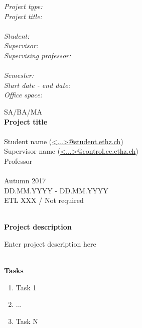 \documentclass[a4wide]{article}
\begin{document}
\noindent
\begin{minipage}[t]{0.3\textwidth}
    \textit{Project type:  \\
    Project title:  \\
    \\
    Student: \\
    Supervisor: \\
    Supervising professor: \\
    \\
    Semester: \\
    Start date - end date: \\
    Office space:}
\end{minipage}
\begin{minipage}[t]{0.6\textwidth}
	SA/BA/MA \\
    \textbf{Project title}  \\
    \\
    Student name (\url{<...>@student.ethz.ch}) \\  %
    Supervisor name (\url{<...>@control.ee.ethz.ch}) \\  %
    Professor \\
    \\
    Autumn 2017  \\
    DD.MM.YYYY - DD.MM.YYYY  \\
    ETL XXX / Not required %
\end{minipage}


\vspace{0.5cm} \noindent \hrulefill \\[0.3cm]
\textbf{Project description} \\[0.2cm] \noindent

Enter project description here

\vspace{0.5cm} \noindent \hrulefill \\[0.3cm]
\textbf{Tasks} \\[0.2cm] \noindent
\begin{enumerate}
\item Task 1
\item ...
\item Task N
\end{enumerate}
\end{document}
